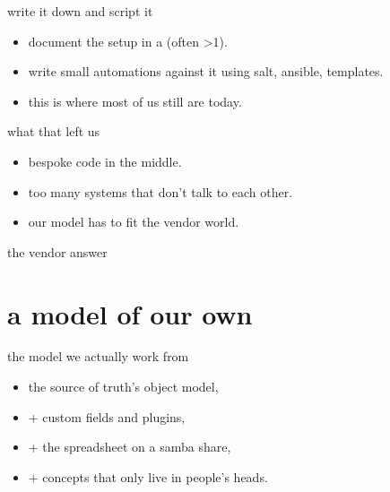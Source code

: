   \begin{frame}{write it down and script it}
    \begin{itemize}
			\item document the setup in a  (often >1).
      \item write small automations against it using salt, ansible, templates.
      \item \textcolor{cwFaint}{this is where most of us still are today.}
    \end{itemize}
  \end{frame}

  \begin{frame}{what that left us}
    \vfill
    \begin{center}
    \end{center}
    \vskip6pt
    \begin{itemize}
      \item bespoke code in the middle.
      \item too many systems that don't talk to each other.
      \item our model has to fit the vendor world.
    \end{itemize}
    \vfill
  \end{frame}

  \begin{frame}{the vendor answer}
  \end{frame}

  \section{a model of our own}
  \begin{frame}{the model we actually work from}
    \begin{itemize}
      \item the source of truth's object model,
      \item + custom fields and plugins,
      \item + the spreadsheet on a samba share,
      \item + concepts that only live in people's heads.
    \end{itemize}
  \end{frame}

